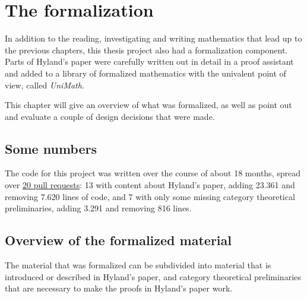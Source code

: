 \chapter{The formalization}\label{ch:the-formalization}
In addition to the reading, investigating and writing mathematics that lead up to the previous chapters, this thesis project also had a formalization component. Parts of Hyland's paper were carefully written out in detail in a proof assistant and added to a library of formalized mathematics with the univalent point of view, called \textit{UniMath}.

This chapter will give an overview of what was formalized, as well as point out and evaluate a couple of design decisions that were made.


\section{Some numbers}
The code for this project was written over the course of about 18 months, spread over \href{https://github.com/UniMath/UniMath/pulls?q=is%3Apr+author%3Aarnoudvanderleer+is%3Aclosed}{20 pull requests}: 13 with content about Hyland's paper, adding 23.361 and removing 7.620 lines of code, and 7 with only some missing category theoretical preliminaries, adding 3.291 and removing 816 lines.

\section{Overview of the formalized material}
The material that was formalized can be subdivided into material that is introduced or described in Hyland's paper, and category theoretical preliminaries that are necessary to make the proofs in Hyland's paper work.

